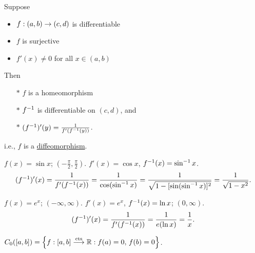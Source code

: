 \documentclass[]{article}
\begin{document}
\begin{theorem}
	Suppose
	\begin{itemize}
		\item $f:(a,b)\rightarrow(c,d)$ is differentiable
		\item $f$ is surjective
		\item $f'(x)\neq0$ for all $x\in(a,b)$
	\end{itemize}
	Then
	\begin{enumerate}
		\item[$*$] $f$ is a homeomorphism
		\item[$*$] $f^{-1}$ is differentiable on $(c,d)$, and
		\item[$*$] $(f^{-1})'(y) = \frac1{f'(f^{-1}(y))}$.
	\end{enumerate}
	i.e., $f$ is a \ul{diffeomorphism}.
\end{theorem}
\begin{example}
	$f(x) = \sin x$; $(-\frac\pi2,\frac\pi2)$.
	$f'(x) = \cos x$, $f^{-1}(x) = \sin^{-1} x$.
	$$ (f^{-1})'(x) = \frac1{f'(f^{-1}(x))} = \frac1{\cos(\sin^{-1} x)} = \frac1{\sqrt{1-[\sin(\sin^{-1} x)]^2}} = \frac1{\sqrt{1-x^2}}.$$
\end{example}
\begin{example}
	$f(x) = e^x$; $(-\infty,\infty)$.
	$f'(x) = e^x$, $f^{-1}(x)=\ln x$; $(0,\infty)$.
	$$(f^{-1})'(x) = \frac1{f'(f^{-1}(x))} = \frac1{e(\ln x)} = \frac1x.$$
\end{example}

$C_0([a,b]) = \left\{ f:[a,b]\overset{\text{cts}}{\longrightarrow}\mathbb{R} : f(a)=0,\,f(b)=0 \right\}$.
\end{document}

